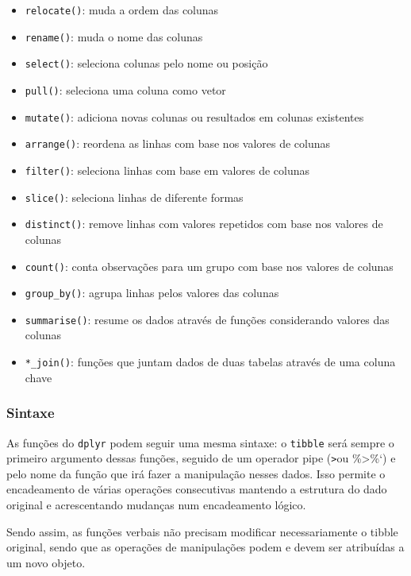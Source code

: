 \documentclass[
]{article}
\providecommand{\tightlist}{%
  \setlength{\itemsep}{0pt}\setlength{\parskip}{0pt}}
\begin{document}
\begin{itemize}
\tightlist
\item
  \texttt{relocate()}: muda a ordem das colunas
\item
  \texttt{rename()}: muda o nome das colunas
\item
  \texttt{select()}: seleciona colunas pelo nome ou posição
\item
  \texttt{pull()}: seleciona uma coluna como vetor
\item
  \texttt{mutate()}: adiciona novas colunas ou resultados em colunas existentes
\item
  \texttt{arrange()}: reordena as linhas com base nos valores de colunas
\item
  \texttt{filter()}: seleciona linhas com base em valores de colunas
\item
  \texttt{slice()}: seleciona linhas de diferente formas
\item
  \texttt{distinct()}: remove linhas com valores repetidos com base nos valores de colunas
\item
  \texttt{count()}: conta observações para um grupo com base nos valores de colunas
\item
  \texttt{group\_by()}: agrupa linhas pelos valores das colunas
\item
  \texttt{summarise()}: resume os dados através de funções considerando valores das colunas
\item
  \texttt{*\_join()}: funções que juntam dados de duas tabelas através de uma coluna chave
\end{itemize}

\hypertarget{sintaxe}{%
\subsubsection{Sintaxe}\label{sintaxe}}

As funções do \texttt{dplyr} podem seguir uma mesma sintaxe: o \texttt{tibble} será sempre o primeiro argumento dessas funções, seguido de um operador pipe (\texttt{\textbar{}\textgreater{}}ou \%\textgreater\%`) e pelo nome da função que irá fazer a manipulação nesses dados. Isso permite o encadeamento de várias operações consecutivas mantendo a estrutura do dado original e acrescentando mudanças num encadeamento lógico.

Sendo assim, as funções verbais não precisam modificar necessariamente o tibble original, sendo que as operações de manipulações podem e devem ser atribuídas a um novo objeto.
\end{document}
